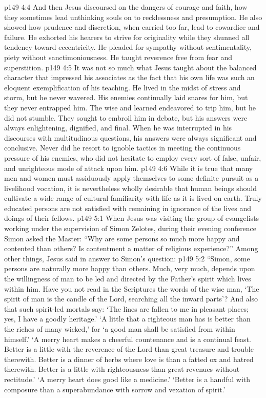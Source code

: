 \vs p149 4:4 And then Jesus discoursed on the dangers of courage and faith, how they sometimes lead unthinking souls on to recklessness and presumption. He also showed how prudence and discretion, when carried too far, lead to cowardice and failure. He exhorted his hearers to strive for originality while they shunned all tendency toward eccentricity. He pleaded for sympathy without sentimentality, piety without sanctimoniousness. He taught reverence free from fear and superstition.
\vs p149 4:5 It was not so much what Jesus taught about the balanced character that impressed his associates as the fact that his own life was such an eloquent exemplification of his teaching. He lived in the midst of stress and storm, but he never wavered. His enemies continually laid snares for him, but they never entrapped him. The wise and learned endeavored to trip him, but he did not stumble. They sought to embroil him in debate, but his answers were always enlightening, dignified, and final. When he was interrupted in his discourses with multitudinous questions, his answers were always significant and conclusive. Never did he resort to ignoble tactics in meeting the continuous pressure of his enemies, who did not hesitate to employ every sort of false, unfair, and unrighteous mode of attack upon him.
\vs p149 4:6 While it is true that many men and women must assiduously apply themselves to some definite pursuit as a livelihood vocation, it is nevertheless wholly desirable that human beings should cultivate a wide range of cultural familiarity with life as it is lived on earth. Truly educated persons are not satisfied with remaining in ignorance of the lives and doings of their fellows.
\vs p149 5:1 When Jesus was visiting the group of evangelists working under the supervision of Simon Zelotes, during their evening conference Simon asked the Master: “Why are some persons so much more happy and contented than others? Is contentment a matter of religious experience?” Among other things, Jesus said in answer to Simon’s question:
\pc \vs p149 5:2 \textcolor{ubdarkred}{“Simon, some persons are naturally more happy than others. Much, very much, depends upon the willingness of man to be led and directed by the Father’s spirit which lives within him. Have you not read in the Scriptures the words of the wise man, ‘The spirit of man is the candle of the Lord, searching all the inward parts’? And also that such spirit\hyp{}led mortals say: ‘The lines are fallen to me in pleasant places; yes, I have a goodly heritage.’ ‘A little that a righteous man has is better than the riches of many wicked,’ for ‘a good man shall be satisfied from within himself.’ ‘A merry heart makes a cheerful countenance and is a continual feast. Better is a little with the reverence of the Lord than great treasure and trouble therewith. Better is a dinner of herbs where love is than a fatted ox and hatred therewith. Better is a little with righteousness than great revenues without rectitude.’ ‘A merry heart does good like a medicine.’ ‘Better is a handful with composure than a superabundance with sorrow and vexation of spirit.’}
